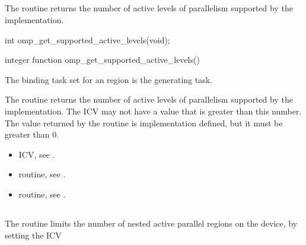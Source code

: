 \subsection{}
\label{subsec:omp_get_supported_active_levels}

\summary
The  routine returns the
number of active levels of parallelism supported by the implementation.

\format
\begin{ccppspecific}
\begin{ompcFunction}
int omp_get_supported_active_levels(void);
\end{ompcFunction}
\end{ccppspecific}

\begin{fortranspecific}
\begin{ompfFunction}
integer function omp_get_supported_active_levels()
\end{ompfFunction}
\end{fortranspecific}

\binding
The binding task set for an 
region is the generating task.

\effect
The  routine returns the
number of active levels of parallelism supported by the implementation. The
 ICV may not have a value that is greater than
this number. The value returned by the 
routine is implementation defined, but it must be greater than 0.

\crossreferences
\begin{itemize}
\item {} ICV, see
.

\item {} routine, see
.

\item {} routine, see
.
\end{itemize}








\subsection{}
\label{subsec:omp_set_max_active_levels}
\summary
The  routine limits the number of nested active
parallel regions on the device, by setting the  ICV



